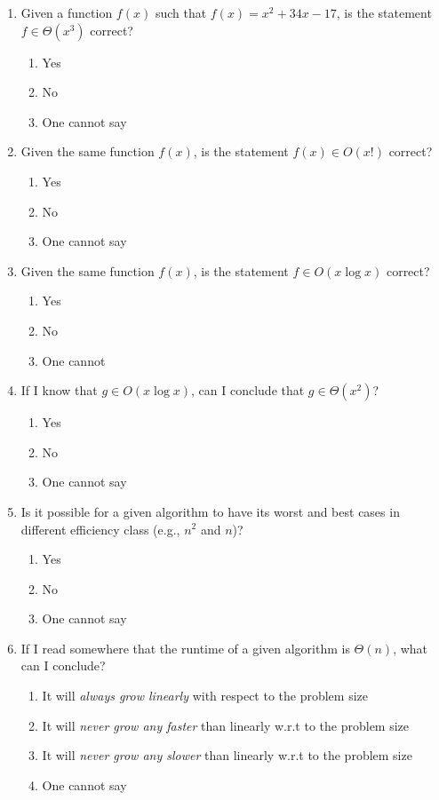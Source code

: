 \documentclass[11pt]{article}
\begin{document}
\begin{enumerate}
\item Given a function \(f(x)\) such that \(f(x) = x^2 + 34x - 17\), is the
statement \(f \in \Theta(x^3)\) correct?
\begin{enumerate}
\item Yes
\item No
\item One cannot say
\end{enumerate}

\item Given the same function \(f(x)\), is the statement \(f(x) \in
   O(x!)\) correct?
\begin{enumerate}
\item Yes
\item No
\item One cannot say
\end{enumerate}

\item Given the same function \(f(x)\), is the statement \(f \in O(x \log x)\)
correct?
\begin{enumerate}
\item Yes
\item No
\item One cannot
\end{enumerate}

\item If I know that \(g \in O(x \log x)\), can I conclude that \(g \in
   \Theta(x^2)\)?
\begin{enumerate}
\item Yes
\item No
\item One cannot say
\end{enumerate}

\item Is it possible for a given algorithm to have its worst and best
cases in different efficiency class (e.g., \(n^2\) and \(n\))?
\begin{enumerate}
\item Yes
\item No
\item One cannot say
\end{enumerate}

\item If I read somewhere that the runtime of a given algorithm is \(\Theta(n)\),
what can I conclude?
\begin{enumerate}
\item It will \emph{always grow linearly} with respect to the problem size
\item It will \emph{never grow any faster} than linearly w.r.t to the problem size
\item It will \emph{never grow any slower} than linearly w.r.t to the problem size
\item One cannot say
\end{enumerate}


\end{enumerate}
\end{document}
